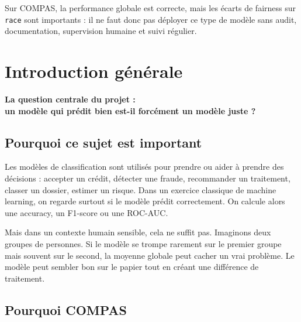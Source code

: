 \documentclass[12pt,a4paper]{report}
\begin{document}
\begin{tcolorbox}[warningbox, title={Conclusion en une phrase}]
Sur COMPAS, la performance globale est correcte, mais les écarts de fairness sur \texttt{race} sont importants : il ne faut donc pas déployer ce type de modèle sans audit, documentation, supervision humaine et suivi régulier.
\end{tcolorbox}

\tableofcontents
{}
\listoffigures
{}
\listoftables
{}
\clearpage

\chapter*{Introduction générale}

\begin{tcolorbox}[summarybox]
\centering\large\bfseries
La question centrale du projet :\\
un modèle qui prédit bien est-il forcément un modèle juste ?
\end{tcolorbox}

\section*{Pourquoi ce sujet est important}

Les modèles de classification sont utilisés pour prendre ou aider à prendre des décisions : accepter un crédit, détecter une fraude, recommander un traitement, classer un dossier, estimer un risque. Dans un exercice classique de machine learning, on regarde surtout si le modèle prédit correctement. On calcule alors une accuracy, un F1-score ou une ROC-AUC.

Mais dans un contexte humain sensible, cela ne suffit pas. Imaginons deux groupes de personnes. Si le modèle se trompe rarement sur le premier groupe mais souvent sur le second, la moyenne globale peut cacher un vrai problème. Le modèle peut sembler bon sur le papier tout en créant une différence de traitement.

\section*{Pourquoi COMPAS}
\end{document}
